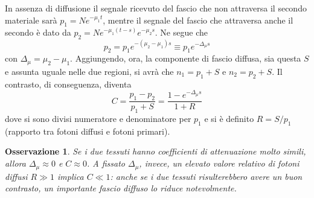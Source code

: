 \documentclass[11pt, a4paper]{scrartcl}
\theoremstyle{style}
\newtheorem{osservazione}{Osservazione}[section]
\theoremstyle{style1}
\numberwithin{equation}{subsection}
\begin{document}
In assenza di diffusione il segnale ricevuto del fascio che non attraversa il secondo materiale sar\`a $p_1 = N e^{-\mu _1 t}$, mentre il segnale del fascio che attraversa anche il secondo \`e dato da $p_2 = N e^{-\mu _1(t-s)}e^{-\mu _2 s}$.
Ne segue che 
\[
p_2 = p_1 e^{-(\mu _2 - \mu _1) s}\equiv p_1 e^{-\Delta_\mu s}
\] 
con $\Delta _\mu = \mu _2 - \mu _1$.
Aggiungendo, ora, la componente di fascio diffusa, sia questa $S$ e assunta uguale nelle due regioni, si avr\`a che $n_1 = p_1 + S$ e $n_2 = p_2 + S$.
Il contrasto, di conseguenza, diventa
\begin{equation}
	C = \frac{p_1 - p_2}{ p_1 + S} = \frac{1 - e^{-\Delta _\mu s}}{1+ R}
\end{equation}
dove si sono divisi numeratore e denominatore per $p_1$ e si \`e definito $R = S / p_1$ (rapporto tra fotoni diffusi e fotoni primari).
\begin{osservazione}
Se i due tessuti hanno coefficienti di attenuazione molto simili, allora $\Delta _\mu  \approx 0$ e $C\approx 0$.
A fissato $\Delta_ \mu $, invece, un elevato valore relativo di fotoni diffusi $R \gg 1$ implica $C \ll 1$: anche se i due tessuti risulterebbero avere un buon contrasto, un importante fascio diffuso lo riduce notevolmente.
\end{osservazione}
\end{document}
